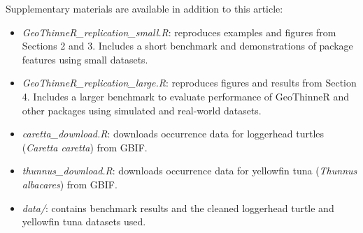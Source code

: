 Supplementary materials are available in addition to this article:

\begin{itemize}
\tightlist
\item
  \emph{GeoThinneR\_replication\_small.R}: reproduces examples and figures from Sections 2 and 3. Includes a short benchmark and demonstrations of package features using small datasets.
\item
  \emph{GeoThinneR\_replication\_large.R}: reproduces figures and results from Section 4. Includes a larger benchmark to evaluate performance of GeoThinneR and other packages using simulated and real-world datasets.
\item
  \emph{caretta\_download.R}: downloads occurrence data for loggerhead turtles (\emph{Caretta caretta}) from GBIF.
\item
  \emph{thunnus\_download.R}: downloads occurrence data for yellowfin tuna (\emph{Thunnus albacares}) from GBIF.
\item
  \emph{data/}: contains benchmark results and the cleaned loggerhead turtle and yellowfin tuna datasets used.
\end{itemize}



\address{%
Jorge Mestre-Tomás\\
Renewable Marine Resources Department, Institut de Ciències del Mar (ICM-CSIC), Barcelona, SpainDepartment of Applied Statistics and Operational Research, and Quality, Universitat Politècnica de València (UPV), Valencia, Spain\\%
\\
%
\url{https://github.com/jmestret}\\%
\textit{ORCiD: \href{https://orcid.org/0000-0002-8983-3417}{0000-0002-8983-3417}}\\%
\href{mailto:jorgemestre@icm.csic.es}{\nolinkurl{jorgemestre@icm.csic.es}}%
}
